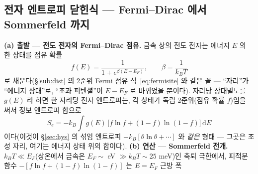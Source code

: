 \documentclass[11pt,a4paper]{article}
\newcommand{\dd}{\mathrm{d}}
\begin{document}
\subsection{전자 엔트로피 닫힌식 — Fermi--Dirac 에서 Sommerfeld 까지}\label{sub:sommerfeld}
\textbf{(a) 출발 — 전도 전자의 Fermi--Dirac 점유.} 금속 상의 전도 전자는 에너지 $E$ 의 한 상태를 점유 확률
\begin{equation}
f(E)=\frac{1}{1+e^{\beta(E-E_F)}},\qquad \beta=\frac{1}{k_BT}
\label{eq:fd}
\end{equation}
로 채운다(\S\ref{sub:dist} 의 2준위 Fermi 점유 식~\eqref{eq:fermisite} 와 같은 꼴 — ``자리''가 ``에너지 상태''로,
``초과 퍼텐셜''이 $E-E_F$ 로 바뀌었을 뿐이다). 자리당 상태밀도를 $g(E)$ 라 하면 한 자리당 전자 엔트로피는, 각 상태가
독립 2준위(점유 확률 $f$)임을 써서 정보 엔트로피 합으로
\begin{equation}
S_e=-k_B\!\int\! g(E)\,\big[f\ln f+(1-f)\ln(1-f)\big]\,\dd E
\label{eq:sefull}
\end{equation}
이다(이것이 \S\ref{sec:hys} 의 섞임 엔트로피 $-k_B[\theta\ln\theta+\cdots]$ 와 \emph{같은} 형태 — 그곳은 조성 자리,
여기는 에너지 상태 위의 합이다). \textbf{(b) 연산 — Sommerfeld 전개.} $k_BT\ll E_F$(상온에서 금속은
$E_F\sim$ eV $\gg k_BT\sim25$ meV)인 축퇴 극한에서, 피적분 함수 $-[f\ln f+(1-f)\ln(1-f)]$ 는 $E=E_F$ 근방 폭
\end{document}

